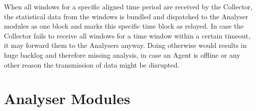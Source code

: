 When all windows for a specific aligned time period are received by the Collector, the statistical data from the windows is bundled and dispatched to the Analyser modules as one block and marks this specific time block as relayed.
In case the Collector fails to receive all windows for a time window within a certain timeout, it may forward them to the Analysers anyway.
Doing otherwise would results in huge backlog and therefore missing analysis, in case an Agent is offline or any other reason the transmission of data might be disrupted.

\section{Analyser Modules}
\label{sec:concept:anal}

